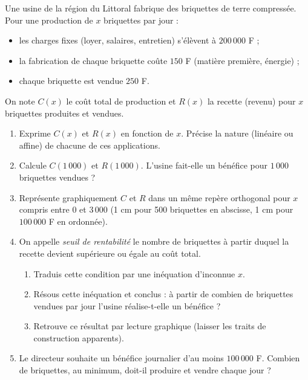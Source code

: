 \documentclass[11pt]{article}
\begin{document}
\begin{exercice}
Une usine de la région du Littoral fabrique des briquettes de terre compressée. Pour une production de $x$ briquettes par jour :
\begin{itemize}
\item les charges fixes (loyer, salaires, entretien) s'élèvent à $200\,000$ F ;
\item la fabrication de chaque briquette coûte $150$ F (matière première, énergie) ;
\item chaque briquette est vendue $250$ F.
\end{itemize}
On note $C(x)$ le coût total de production et $R(x)$ la recette (revenu) pour $x$ briquettes produites et vendues.
\begin{enumerate}
\item Exprime $C(x)$ et $R(x)$ en fonction de $x$. Précise la nature (linéaire ou affine) de chacune de ces applications.
\item Calcule $C(1\,000)$ et $R(1\,000)$. L'usine fait-elle un bénéfice pour $1\,000$ briquettes vendues ?
\item Représente graphiquement $C$ et $R$ dans un même repère orthogonal pour $x$ compris entre $0$ et $3\,000$ (1 cm pour 500 briquettes en abscisse, 1 cm pour $100\,000$ F en ordonnée).
\item On appelle \emph{seuil de rentabilité} le nombre de briquettes à partir duquel la recette devient supérieure ou égale au coût total.
\begin{enumerate}
\item Traduis cette condition par une inéquation d'inconnue $x$.
\item Résous cette inéquation et conclus : à partir de combien de briquettes vendues par jour l'usine réalise-t-elle un bénéfice ?
\item Retrouve ce résultat par lecture graphique (laisser les traits de construction apparents).
\end{enumerate}
\item Le directeur souhaite un bénéfice journalier d'au moins $100\,000$ F. Combien de briquettes, au minimum, doit-il produire et vendre chaque jour ?
\end{enumerate}
\end{exercice}
\end{document}

